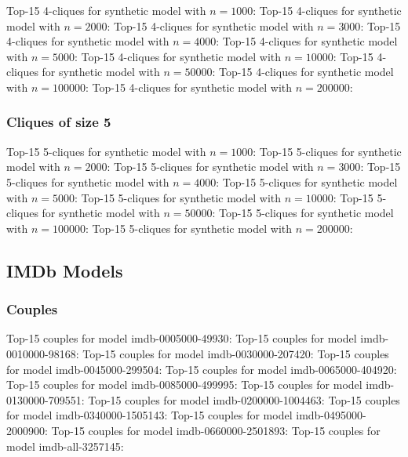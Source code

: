 \documentclass[a4paper,11pt]{article}
\newcommand{\p}[1]{\textsf{\small #1}}
\newcommand{\qr}[3]{\noindent{}Top-15 #2 for #3:{\scriptsize}}
\begin{document}
\qr{synth-1000.query.4cliques}{4-cliques}{synthetic model with \(n=1000\)}
\qr{synth-2000.query.4cliques}{4-cliques}{synthetic model with \(n=2000\)}
\qr{synth-3000.query.4cliques}{4-cliques}{synthetic model with \(n=3000\)}
\qr{synth-4000.query.4cliques}{4-cliques}{synthetic model with \(n=4000\)}
\qr{synth-5000.query.4cliques}{4-cliques}{synthetic model with \(n=5000\)}
\qr{synth-10000.query.4cliques}{4-cliques}{synthetic model with \(n=10000\)}
\qr{synth-50000.query.4cliques}{4-cliques}{synthetic model with \(n=50000\)}
\qr{synth-100000.query.4cliques}{4-cliques}{synthetic model with \(n=100000\)}
\qr{synth-200000.query.4cliques}{4-cliques}{synthetic model with \(n=200000\)}

\newpage
\subsubsection{Cliques of size 5}

\qr{synth-1000.query.5cliques}{5-cliques}{synthetic model with \(n=1000\)}
\qr{synth-2000.query.5cliques}{5-cliques}{synthetic model with \(n=2000\)}
\qr{synth-3000.query.5cliques}{5-cliques}{synthetic model with \(n=3000\)}
\qr{synth-4000.query.5cliques}{5-cliques}{synthetic model with \(n=4000\)}
\qr{synth-5000.query.5cliques}{5-cliques}{synthetic model with \(n=5000\)}
\qr{synth-10000.query.5cliques}{5-cliques}{synthetic model with \(n=10000\)}
\qr{synth-50000.query.5cliques}{5-cliques}{synthetic model with \(n=50000\)}
\qr{synth-100000.query.5cliques}{5-cliques}{synthetic model with \(n=100000\)}
\qr{synth-200000.query.5cliques}{5-cliques}{synthetic model with \(n=200000\)}

\newpage
\subsection{IMDb Models}
\label{sec:top-15:imdb-models}

\subsubsection{Couples}

\qr{imdb-0005000-49930.movies.bin.query.couples}{couples}{model \p{imdb-0005000-49930}}
\qr{imdb-0010000-98168.movies.bin.query.couples}{couples}{model \p{imdb-0010000-98168}}
\qr{imdb-0030000-207420.movies.bin.query.couples}{couples}{model \p{imdb-0030000-207420}}
\qr{imdb-0045000-299504.movies.bin.query.couples}{couples}{model \p{imdb-0045000-299504}}
\qr{imdb-0065000-404920.movies.bin.query.couples}{couples}{model \p{imdb-0065000-404920}}
\qr{imdb-0085000-499995.movies.bin.query.couples}{couples}{model \p{imdb-0085000-499995}}
\qr{imdb-0130000-709551.movies.bin.query.couples}{couples}{model \p{imdb-0130000-709551}}
\qr{imdb-0200000-1004463.movies.bin.query.couples}{couples}{model \p{imdb-0200000-1004463}}
\qr{imdb-0340000-1505143.movies.bin.query.couples}{couples}{model \p{imdb-0340000-1505143}}
\qr{imdb-0495000-2000900.movies.bin.query.couples}{couples}{model \p{imdb-0495000-2000900}}
\qr{imdb-0660000-2501893.movies.bin.query.couples}{couples}{model \p{imdb-0660000-2501893}}
\qr{imdb-all-3257145.movies.bin.query.couples}{couples}{model \p{imdb-all-3257145}}
\end{document}
